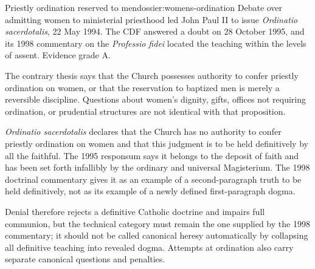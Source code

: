 \begin{heresydossier}{Priestly ordination reserved to men}{dossier:womens-ordination}
\objectfield Debate over admitting women to ministerial priesthood led John Paul II to issue \emph{Ordinatio sacerdotalis}, 22 May 1994. The CDF answered a doubt on 28 October 1995, and its 1998 commentary on the \emph{Professio fidei} located the teaching within the levels of assent. Evidence grade A.

\propositionfield The contrary thesis says that the Church possesses authority to confer priestly ordination on women, or that the reservation to baptized men is merely a reversible discipline. Questions about women's dignity, gifts, offices not requiring ordination, or prudential structures are not identical with that proposition.

\responsefield \emph{Ordinatio sacerdotalis} declares that the Church has no authority to confer priestly ordination on women and that this judgment is to be held definitively by all the faithful. The 1995 responsum says it belongs to the deposit of faith and has been set forth infallibly by the ordinary and universal Magisterium. The 1998 doctrinal commentary gives it as an example of a second-paragraph truth to be held definitively, not as its example of a newly defined first-paragraph dogma.

\aftermathfield Denial therefore rejects a definitive Catholic doctrine and impairs full communion, but the technical category must remain the one supplied by the 1998 commentary; it should not be called canonical heresy automatically by collapsing all definitive teaching into revealed dogma. Attempts at ordination also carry separate canonical questions and penalties.
\end{heresydossier}

